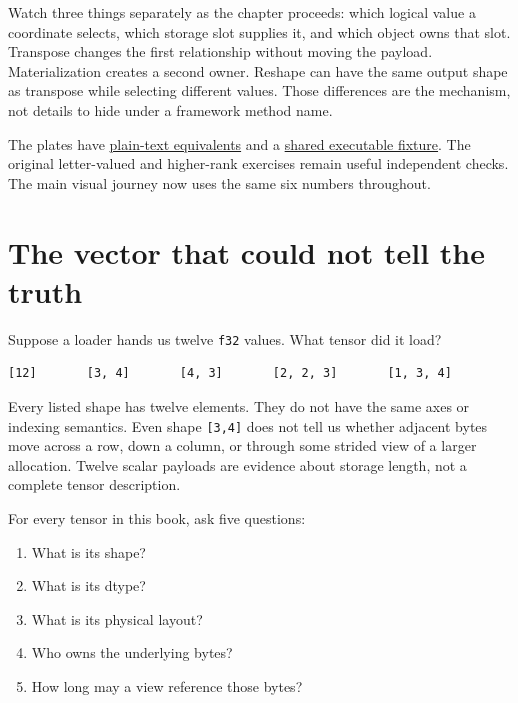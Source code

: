 Watch three things separately as the chapter proceeds: which logical
value a coordinate selects, which storage slot supplies it, and which
object owns that slot. Transpose changes the first relationship without
moving the payload. Materialization creates a second owner. Reshape can
have the same output shape as transpose while selecting different
values. Those differences are the mechanism, not details to hide under a
framework method name.

The plates have
\href{https://github.com/hermonai/inside-the-llm-engine/blob/astra-visual-rewrite/figures/chapter05-atlas.md}{plain-text
equivalents} and a
\href{https://github.com/hermonai/inside-the-llm-engine/blob/astra-visual-rewrite/code/reference/fixtures/chapter05-visual.json}{shared
executable fixture}. The original letter-valued and higher-rank
exercises remain useful independent checks. The main visual journey now
uses the same six numbers throughout.

\section{The vector that could not tell the
truth}\label{the-vector-that-could-not-tell-the-truth}

Suppose a loader hands us twelve \texttt{f32} values. What tensor did it
load?

\begin{verbatim}
[12]       [3, 4]       [4, 3]       [2, 2, 3]       [1, 3, 4]
\end{verbatim}

Every listed shape has twelve elements. They do not have the same axes
or indexing semantics. Even shape \texttt{{[}3,4{]}} does not tell us
whether adjacent bytes move across a row, down a column, or through some
strided view of a larger allocation. Twelve scalar payloads are evidence
about storage length, not a complete tensor description.

For every tensor in this book, ask five questions:

\begin{enumerate}
\def\labelenumi{\arabic{enumi}.}
\tightlist
\item
  What is its shape?
\item
  What is its dtype?
\item
  What is its physical layout?
\item
  Who owns the underlying bytes?
\item
  How long may a view reference those bytes?
\end{enumerate}

